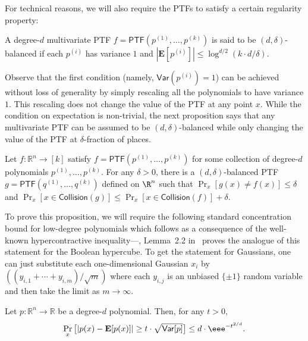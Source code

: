 \documentclass{toc}
\begin{document}
For technical reasons, we will also require the PTFs to satisfy a certain regularity property:
\begin{definition} A degree-$d$ multivariate PTF $f = \mathsf{PTF}(p^{(1)}, \ldots, p^{(k)})$ is said to be $(d, \delta)$-balanced if each $p^{(i)}$ has variance $1$ and $|\mathbf{E}[p^{(i)}]| \le \log^{d/2} (k \cdot d/\delta)$. 
\end{definition}
Observe that the first condition (namely, $\mathsf{Var}(p^{(i)}) =1$) can be
achieved without loss of generality by simply rescaling all the polynomials to
have variance $1$. This rescaling does not change the value of the PTF at any
point $x$. While the condition on expectation is non-trivial, the next
proposition says that any multivariate PTF can be assumed to be
$(d,\delta)$-balanced while only changing the value of the PTF at
$\delta$-fraction of places. 
\begin{proposition}\label{prop:balanced}
Let $f : \mathbb{R}^n \rightarrow [k]$ satisfy $f = \mathsf{PTF}(p^{(1)},
\ldots, p^{(k)})$ for some
%
collection of
%
degree-$d$ polynomials $p^{(1)}, \dots, p^{(k)}$.
For any $\delta > 0$,
there is a $(d,\delta)$-balanced PTF $g = \mathsf{PTF}(q^{(1)}, \ldots, q^{(k)})$
defined on $\R^n$ such that $\Pr_{x} [g(x) \neq  f(x) ] \le \delta$ and
$\Pr_{x}[ x \in \mathsf{Collision}(g)] \le \Pr_{x} [x \in
\mathsf{Collision}(f)] + \delta$.
%
%
\end{proposition}
To prove this proposition, we will require the following standard concentration bound for low-degree polynomials which follows as a consequence of the well-known hypercontractive inequality---\eg, Lemma~2.2 in~\cite{DFKO06} proves the analogue of this statement for the Boolean hypercube. To get the statement for Gaussians, one can just substitute each one-dimensional Gaussian $x_i$ by $((y_{i,1} + \cdots + y_{i,m})/\sqrt{m})$ where each $y_{i,j}$ is an unbiased $\{\pm 1\}$ random variable and then take the limit as $m \rightarrow \infty$. %
\begin{theorem}\label{thm:hyper}
Let $p: \mathbb{R}^n \rightarrow \mathbb{R}$ be a degree-$d$ polynomial. Then, for any $t>0$, 
$$
\Pr_{x} \big[|p(x) - \mathbf{E}[p(x)]| \ge t \cdot \sqrt{\mathsf{Var}[p]}\big]  \leq d \cdot \eee^{-t^{2/d}}.
$$
\end{theorem}
\end{document}
